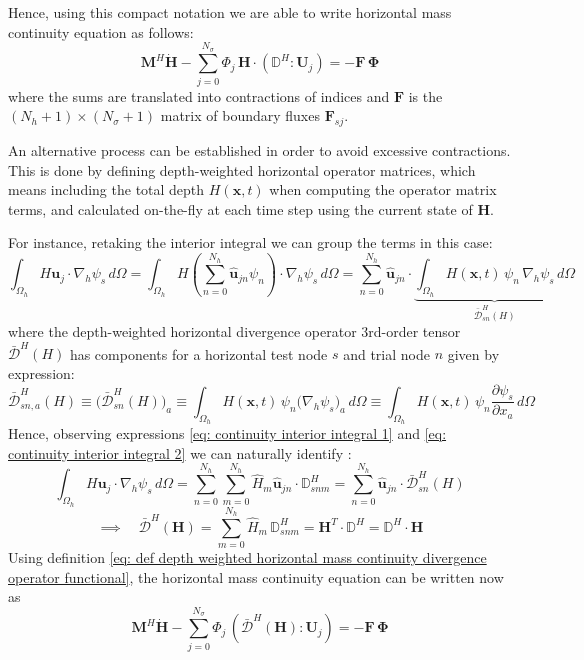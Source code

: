 \documentclass{article}
\newcommand{\Ns}{N_\sigma}
\newcommand{\uj}{\mathbf{u}_j}
\newcommand{\sumj}{\sum_{j=0}^{\Ns}}
\newcommand{\nablah}{\nabla_h}
\newcommand{\Nh}{N_h}
\newcommand{\sumNhn}{\sum_{n=0}^{\Nh}}
\newcommand{\sumNhm}{\sum_{m=0}^{\Nh}}
\newcommand{\uhjn}{\hat{\mathbf{u}}_{jn}}
\newcommand{\Hm}{\hat{H}_m}
\newcommand{\ddxa}[1]{\frac{\partial #1}{\partial x_a}}
\newcommand{\HDsnma}{\mathbb{D}_{snm}^H}
\newcommand{\HmM}{\mathbf{M}^H}
\newcommand{\HtDdwH}{\bar{\boldsymbol{\mathcal{D}}}^H(\Hvec)}
\newcommand{\HDdwsn}{\bar{\boldsymbol{\mathcal{D}}}_{sn}^H}
\newcommand{\HtDdw}{\bar{\boldsymbol{\mathcal{D}}}^H}
\newcommand{\HttD}{\mathbb{D}^H}
\newcommand{\Uj}{\mathbf{U}_j}
\newcommand{\Hvec}{\mathbf{H}}
\begin{document}
Hence, using this compact notation we are able to write horizontal mass continuity equation as follows:
$$\HmM \dot{\Hvec} - \sumj\Phi_j \, \Hvec\cdot(\HttD :\Uj) = -\mathbf{F}\,\boldsymbol{\Phi}$$
where the sums are translated into contractions of indices and $\mathbf{F}$ is the $(\Nh+1)\times(\Ns+1)$ matrix of boundary fluxes $\mathbf{F}_{sj}$.

An alternative process can be established in order to avoid excessive contractions.
This is done by defining depth-weighted horizontal operator matrices, which means including the total depth $H(\mathbf{x},t)$ when computing the operator matrix terms, and calculated on-the-fly at each time step using the current state of $\mathbf{H}$. 

For instance, retaking the interior integral we can group the terms in this case:
\begin{equation}
    \int_{\Omega_h} H\uj\cdot\nablah\psi_s\,d\Omega =  \int_{\Omega_h} H\left(\sumNhn\uhjn \psi_n\right) \cdot \nablah\psi_s\,d\Omega = \sumNhn \uhjn \cdot \underbrace{\int_{\Omega_h} H(\mathbf{x},t)\,\psi_n\,\nablah\psi_s\,d\Omega}_{\HDdwsn(H)} 
    \label{eq: continuity interior integral 2}
\end{equation}
where the depth-weighted horizontal divergence operator 3rd-order tensor $\HtDdw(H)$ has components for a horizontal test node $s$ and trial node $n$ given by expression:
\begin{equation}
    \boxed{\HtDdw_{sn,a}(H) \equiv \big(\HDdwsn(H)\big)_a \equiv \int_{\Omega_h} H(\mathbf{x}, t) \, \psi_n \big( \nabla_h \psi_s \big)_a\, d\Omega \equiv \int_{\Omega_h} H(\mathbf{x}, t) \, \psi_n \ddxa{\psi_s}\, d\Omega}
    \label{eq: def depth weighted horizontal mass continuity divergence operator}
\end{equation}
Hence, observing expressions \eqref{eq: continuity interior integral 1} and \eqref{eq: continuity interior integral 2} we can naturally identify :
$$\int_{\Omega_h} H\uj\cdot\nablah\psi_s\,d\Omega
        = \sumNhn\sumNhm \Hm \uhjn \cdot \HDsnma = \sumNhn \uhjn \cdot \HDdwsn(H)$$
\begin{equation}
    \implies \quad \boxed{\HtDdwH = \sumNhm \Hm\, \HDsnma =  \Hvec^T \cdot \HttD = \HttD \cdot \Hvec}
    \label{eq: def depth weighted horizontal mass continuity divergence operator functional}
\end{equation}
Using definition \eqref{eq: def depth weighted horizontal mass continuity divergence operator functional}, the horizontal mass continuity equation can be written now as
$$\HmM \dot{\Hvec} - \sumj\Phi_j \, (\HtDdwH :\Uj) = -\mathbf{F}\,\boldsymbol{\Phi}$$
\end{document}
